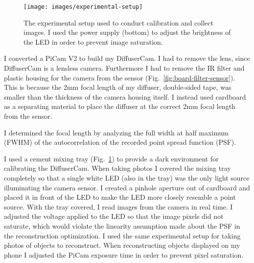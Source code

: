 \documentclass[final]{cvpr}
\begin{document}
\begin{figure}[t]
	\centering
	\texttt{[image: images/experimental-setup]}
	\caption{\label{fig:experimental-setup}
		The experimental setup used to conduct calibration and collect images.
		I used the power supply (bottom) to adjust the brightness of the LED in order to prevent image saturation.}
\end{figure}


\noindent I converted a PiCam V2 to build my DiffuserCam.
I had to remove the lens, since DiffuserCam is a lensless camera.
Furthermore I had to remove the IR filter and plastic housing for the camera
from the sensor (Fig.~\ref{fig:board-filter-sensor}).
This is because the 2mm focal length of my diffuser,
double-sided tape, was smaller than the thickness of the camera housing itself.
I instead used cardboard as a separating material to place the diffuser at the
correct 2mm focal length from the sensor.

I determined the focal length by analyzing the full width at half maximum
(FWHM) of the autocorrelation of the recorded point spread function (PSF).

I used a cement mixing tray (Fig.~\ref{fig:experimental-setup}) to provide
a dark environment for calibrating the DiffuserCam.
When taking photos I covered the mixing tray completely so that a single white
LED (also in the tray) was the only light source illuminating the camera
sensor.
I created a pinhole aperture out of cardboard and placed it in front of the LED
to make the LED more closely resemble a point source.
With the tray covered, I read images from the camera in real time.
I adjusted the voltage applied to the LED so that the image pixels did not
saturate, which would violate the linearity assumption made about the PSF in
the reconstruction optimization.
I used the same experimental setup for taking photos of objects to reconstruct.
When reconstructing objects displayed on my phone I adjusted the PiCam exposure
time in order to prevent pixel saturation.
\end{document}

